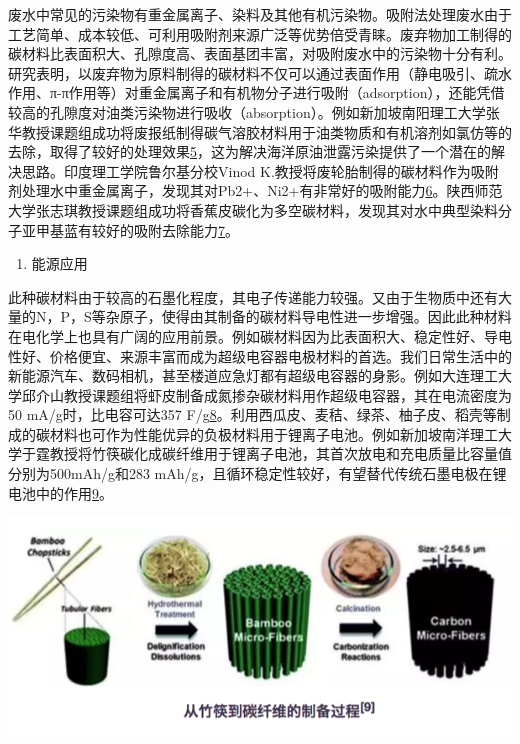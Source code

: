 \documentclass[
]{book}
\providecommand{\tightlist}{%
  \setlength{\itemsep}{0pt}\setlength{\parskip}{0pt}}
\begin{document}
废水中常见的污染物有重金属离子、染料及其他有机污染物。吸附法处理废水由于工艺简单、成本较低、可利用吸附剂来源广泛等优势倍受青睐。废弃物加工制得的碳材料比表面积大、孔隙度高、表面基团丰富，对吸附废水中的污染物十分有利。研究表明，以废弃物为原料制得的碳材料不仅可以通过表面作用（静电吸引、疏水作用、π-π作用等）对重金属离子和有机物分子进行吸附（adsorption），还能凭借较高的孔隙度对油类污染物进行吸收（absorption）。例如新加坡南阳理工大学张华教授课题组成功将废报纸制得碳气溶胶材料用于油类物质和有机溶剂如氯仿等的去除，取得了较好的处理效果\href{Bi\%20H,\%20Huang\%20X,\%20et\%20al.\%20Small\%202014,\%2010,\%203544.}{5}，这为解决海洋原油泄露污染提供了一个潜在的解决思路。印度理工学院鲁尔基分校Vinod K.教授将废轮胎制得的碳材料作为吸附剂处理水中重金属离子，发现其对Pb2+、Ni2+有非常好的吸附能力\href{Gupta\%20V\%20K,\%20Ganjali\%20M\%20R,\%20et\%20al.\%20Chemical\%20Engineering\%20Journal,\%202012,\%20197:\%20330.}{6}。陕西师范大学张志琪教授课题组成功将香蕉皮碳化为多空碳材料，发现其对水中典型染料分子亚甲基蓝有较好的吸附去除能力\href{Liu\%20R\%20L,\%20Liu\%20Y,\%20et\%20al.\%20Bioresourse\%20Technology\%202014,\%20154:\%20138.}{7}。

\begin{enumerate}
\def\labelenumi{\arabic{enumi}.}
\setcounter{enumi}{2}
\tightlist
\item
  能源应用
\end{enumerate}

此种碳材料由于较高的石墨化程度，其电子传递能力较强。又由于生物质中还有大量的N，P，S等杂原子，使得由其制备的碳材料导电性进一步增强。因此此种材料在电化学上也具有广阔的应用前景。例如碳材料因为比表面积大、稳定性好、导电性好、价格便宜、来源丰富而成为超级电容器电极材料的首选。我们日常生活中的新能源汽车、数码相机，甚至楼道应急灯都有超级电容器的身影。例如大连理工大学邱介山教授课题组将虾皮制备成氮掺杂碳材料用作超级电容器，其在电流密度为50 mA/g时，比电容可达357 F/g\href{Gao\%20F,Qu\%20J\%20Y,\%20et\%20al.\%20Electrochim.\%20Acta\%202016,\%20190:\%201134.}{8}。利用西瓜皮、麦秸、绿茶、柚子皮、稻壳等制成的碳材料也可作为性能优异的负极材料用于锂离子电池。例如新加坡南洋理工大学于霆教授将竹筷碳化成碳纤维用于锂离子电池，其首次放电和充电质量比容量值分别为500mAh/g和283 mAh/g，且循环稳定性较好，有望替代传统石墨电极在锂电池中的作用\href{Jiang\%20J,\%20Zhu\%20J\%20H,\%20et\%20al.\%20Energy\%20Environ.\%20Sci.\%202014,\%207:\%202670.}{9}。

\includegraphics[width=8.33in]{images/nano3}
\end{document}
